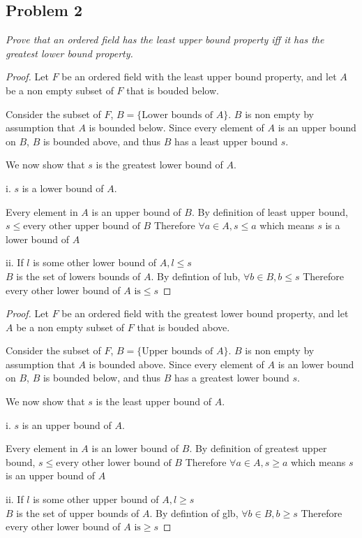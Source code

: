 \documentclass[12pt, a4paper]{article}
\begin{document}
    \subsection*{Problem 2}
        \textit{Prove that an ordered field has the least upper bound
        property iff it has the greatest lower bound property.}
        \begin{proof}
        Let $F$ be an ordered field with the least upper bound property, and let $A$ be a non empty subset of $F$ that is bouded below.

    Consider the subset of $F$, $B = \{ \text{Lower bounds of } A \}$.
        $B$ is non empty by assumption that $A$ is bounded below.
        Since every element of $A$ is an upper bound on $B$, $B$ is bounded above, and thus $B$ has a least upper bound $s$.

    \noindent We now show that $s$ is the greatest lower bound of $A$.

        i. $s$ is a lower bound of $A$. 
        
        Every element in $A$ is an upper bound of $B$. 
        By definition of least upper bound, $s \le \text{every other upper bound of } B$
        Therefore $\forall a \in A, s \le a$ which means $s$ is a lower bound of $A$
        
        ii. If $l$ is some other lower bound of $A, l \le s$ 
        \\$B$ is the set of lowers bounds of $A$. By defintion of lub, $\forall b\in B, b \le s$
        Therefore every other lower bound of $A \text{ is} \le s$
        \end{proof}
        \begin{proof}
            Let $F$ be an ordered field with the greatest lower bound property, and let $A$ be a non empty subset of $F$ that is bouded above.
    
        Consider the subset of $F$, $B = \{ \text{Upper bounds of } A \}$.
            $B$ is non empty by assumption that $A$ is bounded above.
            Since every element of $A$ is an lower bound on $B$, $B$ is bounded below, and thus $B$ has a greatest lower bound $s$.
    
        \noindent We now show that $s$ is the least upper bound of $A$.
    
            i. $s$ is an upper bound of $A$. 
            
            Every element in $A$ is an lower bound of $B$. 
            By definition of greatest upper bound, $s \le \text{every other lower bound of } B$
            Therefore $\forall a \in A, s \ge a$ which means $s$ is an upper bound of $A$
            
            ii. If $l$ is some other upper bound of $A, l \ge s$ 
            \\$B$ is the set of upper bounds of $A$. By defintion of glb, $\forall b\in B, b \ge s$
            Therefore every other lower bound of $A \text{ is} \ge s$ 
            \end{proof}
        \pagebreak
\end{document}
